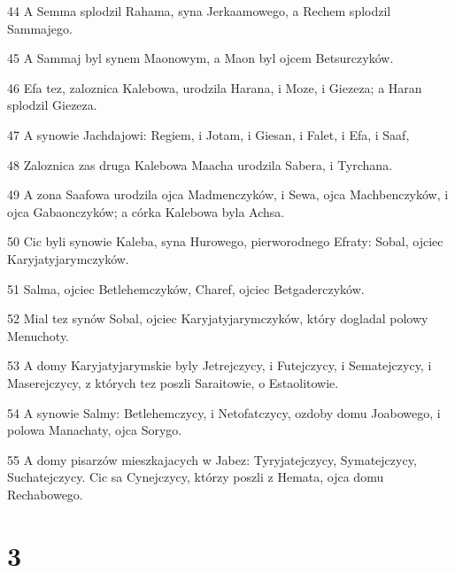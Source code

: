 \par 44 A Semma splodzil Rahama, syna Jerkaamowego, a Rechem splodzil Sammajego.
\par 45 A Sammaj byl synem Maonowym, a Maon byl ojcem Betsurczyków.
\par 46 Efa tez, zaloznica Kalebowa, urodzila Harana, i Moze, i Giezeza; a Haran splodzil Giezeza.
\par 47 A synowie Jachdajowi: Regiem, i Jotam, i Giesan, i Falet, i Efa, i Saaf,
\par 48 Zaloznica zas druga Kalebowa Maacha urodzila Sabera, i Tyrchana.
\par 49 A zona Saafowa urodzila ojca Madmenczyków, i Sewa, ojca Machbenczyków, i ojca Gabaonczyków; a córka Kalebowa byla Achsa.
\par 50 Cic byli synowie Kaleba, syna Hurowego, pierworodnego Efraty: Sobal, ojciec Karyjatyjarymczyków.
\par 51 Salma, ojciec Betlehemczyków, Charef, ojciec Betgaderczyków.
\par 52 Mial tez synów Sobal, ojciec Karyjatyjarymczyków, który dogladal polowy Menuchoty.
\par 53 A domy Karyjatyjarymskie byly Jetrejczycy, i Futejczycy, i Sematejczycy, i Maserejczycy, z których tez poszli Saraitowie, o Estaolitowie.
\par 54 A synowie Salmy: Betlehemczycy, i Netofatczycy, ozdoby domu Joabowego, i polowa Manachaty, ojca Sorygo.
\par 55 A domy pisarzów mieszkajacych w Jabez: Tyryjatejczycy, Symatejczycy, Suchatejczycy. Cic sa Cynejczycy, którzy poszli z Hemata, ojca domu Rechabowego.

\chapter{3}

